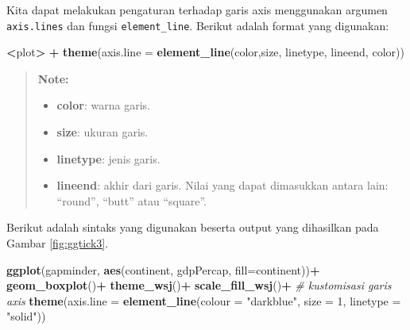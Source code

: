 \documentclass[]{book}
\newenvironment{Shaded}{\begin{snugshade}}{\end{snugshade}}
\newcommand{\KeywordTok}[1]{\textcolor[rgb]{0.13,0.29,0.53}{\textbf{#1}}}
\newcommand{\DataTypeTok}[1]{\textcolor[rgb]{0.13,0.29,0.53}{#1}}
\newcommand{\DecValTok}[1]{\textcolor[rgb]{0.00,0.00,0.81}{#1}}
\newcommand{\StringTok}[1]{\textcolor[rgb]{0.31,0.60,0.02}{#1}}
\newcommand{\CommentTok}[1]{\textcolor[rgb]{0.56,0.35,0.01}{\textit{#1}}}
\newcommand{\OperatorTok}[1]{\textcolor[rgb]{0.81,0.36,0.00}{\textbf{#1}}}
\newcommand{\NormalTok}[1]{#1}
\providecommand{\tightlist}{%
  \setlength{\itemsep}{0pt}\setlength{\parskip}{0pt}}
\begin{document}
Kita dapat melakukan pengaturan terhadap garis axis menggunakan argumen
\texttt{axis.lines} dan fungsi \texttt{element\_line}. Berikut adalah
format yang digunakan:

\begin{Shaded}
\begin{Highlighting}[]
\OperatorTok{<}\NormalTok{plot}\OperatorTok{>}\StringTok{ }\OperatorTok{+}\StringTok{ }\KeywordTok{theme}\NormalTok{(}\DataTypeTok{axis.line =} \KeywordTok{element_line}\NormalTok{(color,size, linetype,}
\NormalTok{                                        lineend, color))}
\end{Highlighting}
\end{Shaded}

\begin{quote}
\textbf{Note: }

\begin{itemize}
\tightlist
\item
  \textbf{color}: warna garis.
\item
  \textbf{size}: ukuran garis.
\item
  \textbf{linetype}: jenis garis.
\item
  \textbf{lineend}: akhir dari garis. Nilai yang dapat dimasukkan antara
  lain: ``round'', ``butt'' atau ``square''.
\end{itemize}
\end{quote}

Berikut adalah sintaks yang digunakan beserta output yang dihasilkan
pada Gambar \ref{fig:ggtick3}.

\begin{Shaded}
\begin{Highlighting}[]
\KeywordTok{ggplot}\NormalTok{(gapminder, }\KeywordTok{aes}\NormalTok{(continent, gdpPercap,}
                      \DataTypeTok{fill=}\NormalTok{continent))}\OperatorTok{+}
\StringTok{  }\KeywordTok{geom_boxplot}\NormalTok{()}\OperatorTok{+}
\StringTok{  }\KeywordTok{theme_wsj}\NormalTok{()}\OperatorTok{+}
\StringTok{  }\KeywordTok{scale_fill_wsj}\NormalTok{()}\OperatorTok{+}
\StringTok{  }\CommentTok{# kustomisasi garis axis}
\StringTok{  }\KeywordTok{theme}\NormalTok{(}\DataTypeTok{axis.line =} \KeywordTok{element_line}\NormalTok{(}\DataTypeTok{colour =} \StringTok{"darkblue"}\NormalTok{, }
                      \DataTypeTok{size =} \DecValTok{1}\NormalTok{, }\DataTypeTok{linetype =} \StringTok{"solid"}\NormalTok{))}
\end{Highlighting}
\end{Shaded}
\end{document}

